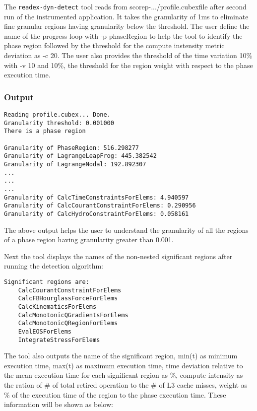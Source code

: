 \documentclass[12pt]{article}
\begin{document}
The \texttt{readex-dyn-detect} tool reads from scorep-.../profile.cubexfile after second run of the instrumented application. It takes the granularity of 1ms to eliminate fine granular regions having granularity below the threshold. The user define the name of the progress loop with -p phaseRegion to help the tool to identify the phase region followed by the threshold for the compute instensity metric deviation as -c 20. The user also provides the threshold of the time variation 10\% with -v 10 and 10\%, the threshold for the region weight with respect to the phase execution time.

\subsubsection{Output}

\begin{verbatim}
Reading profile.cubex... Done.
Granularity threshold: 0.001000
There is a phase region

Granularity of PhaseRegion: 516.298277
Granularity of LagrangeLeapFrog: 445.382542
Granularity of LagrangeNodal: 192.892307
...
...
...
Granularity of CalcTimeConstraintsForElems: 4.940597
Granularity of CalcCourantConstraintForElems: 0.290956
Granularity of CalcHydroConstraintForElems: 0.058161
\end{verbatim}

The above output helps the user to understand the granularity of all the regions of a phase region having granularity greater than 0.001.

Next the tool displays the names of the non-nested significant regions after running the detection algorithm:

\begin{verbatim}
Significant regions are: 
    CalcCourantConstraintForElems 
    CalcFBHourglassForceForElems 
    CalcKinematicsForElems 
    CalcMonotonicQGradientsForElems 
    CalcMonotonicQRegionForElems 
    EvalEOSForElems 
    IntegrateStressForElems 
\end{verbatim}

The tool also outputs the name of the significant region, min(t) as minimum execution time, max(t) as maximum execution time, time deviation relative to the mean execution time for each significant region as \%, compute intensity as the ration of \# of total retired operation to the \# of L3 cache misses, weight as \% of the execution time of the region to the phase execution time. These information will be shown as below: 
\end{document}
